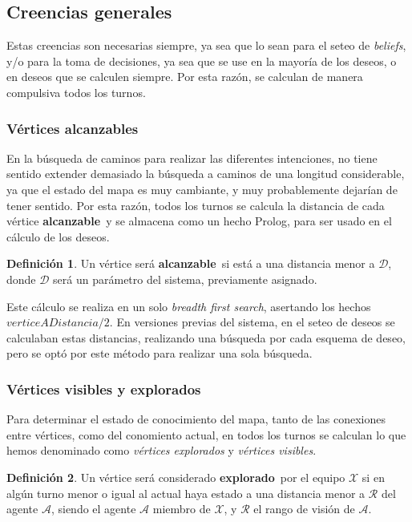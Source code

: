 \documentclass[oneside]{book}
\theoremstyle{definition}
\newtheorem{definicion}{Definición}[section]
\newcommand{\lit}[1]{\mbox{$ #1$}}
\begin{document}
\subsection{Creencias generales}

\label{sec:creenciasGenerales}

Estas creencias son necesarias siempre, ya sea que lo sean para el seteo de 
\textit{beliefs}, y/o para la toma de decisiones, ya sea que se use en la mayoría
de los deseos, o en deseos que se calculen siempre. Por esta razón, se calculan
de manera compulsiva todos los turnos.


\subsubsection{Vértices alcanzables}

En la búsqueda de caminos para realizar las diferentes intenciones, no tiene sentido
extender demasiado la búsqueda a caminos de una longitud considerable, ya que el 
estado del mapa es muy cambiante, y muy probablemente dejarían de tener sentido. Por
esta razón, todos los turnos se calcula la distancia de cada vértice 
\textbf{alcanzable}\ y se almacena como un hecho Prolog, para ser usado en el 
cálculo de los deseos.

\begin{definicion}
Un vértice será \textbf{alcanzable}\ si está a una distancia menor a $\mathcal 
D$, donde $\mathcal D$ será un parámetro del sistema, previamente asignado.
\end{definicion}

Este cálculo se realiza en un solo \textit{breadth first search}, asertando los hechos
\lit{verticeADistancia/2}. En versiones previas del sistema, en el seteo de deseos
se calculaban estas distancias, realizando una búsqueda por cada esquema de deseo, 
pero se optó por este método para realizar una sola búsqueda.


\subsubsection{Vértices visibles y explorados}

Para determinar el estado de conocimiento del mapa, tanto de las conexiones
entre vértices, como del conomiento actual, en todos los turnos se calculan
lo que hemos denominado como \textit{vértices explorados} y \textit{vértices 
visibles}. 

\begin{definicion}
Un vértice será considerado \textbf{explorado}\ por el equipo $\mathcal X$ si 
en algún turno menor o igual al actual haya estado a una distancia menor a 
$\mathcal R$ del agente $\mathcal A$, siendo el agente $\mathcal A$ miembro de 
$\mathcal X$, y $\mathcal R$ el rango de visión de $\mathcal A$.
\end{definicion}
\end{document}
